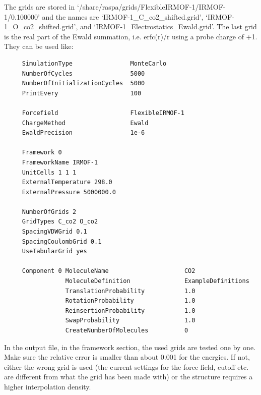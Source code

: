 \noindent The grids are stored in `/share/raspa/grids/FlexibleIRMOF-1/IRMOF-1/0.100000' and the names are
`IRMOF-1\_C\_co2\_shifted.grid', `IRMOF-1\_O\_co2\_shifted.grid', and `IRMOF-1\_Electrostatics\_Ewald.grid'.
The last grid is the real part of the Ewald summation, i.e. erfc(r)/r using a probe charge of +1.
They can be used like:
\begin{tiny}
\begin{verbatim}
     SimulationType                MonteCarlo
     NumberOfCycles                5000
     NumberOfInitializationCycles  5000
     PrintEvery                    100

     Forcefield                    FlexibleIRMOF-1
     ChargeMethod                  Ewald
     EwaldPrecision                1e-6

     Framework 0
     FrameworkName IRMOF-1
     UnitCells 1 1 1
     ExternalTemperature 298.0
     ExternalPressure 5000000.0

     NumberOfGrids 2
     GridTypes C_co2 O_co2
     SpacingVDWGrid 0.1
     SpacingCoulombGrid 0.1
     UseTabularGrid yes

     Component 0 MoleculeName                     CO2
                 MoleculeDefinition               ExampleDefinitions
                 TranslationProbability           1.0
                 RotationProbability              1.0
                 ReinsertionProbability           1.0
                 SwapProbability                  1.0
                 CreateNumberOfMolecules          0
\end{verbatim}
\end{tiny}
In the output file, in the framework section, the used grids are tested one by one.
Make sure the relative error is smaller than about 0.001 for the energies.
If not, either the wrong grid is used (the current settings for the force field, cutoff etc. are different from what the grid has been made with)
or the structure requires a higher interpolation density.
